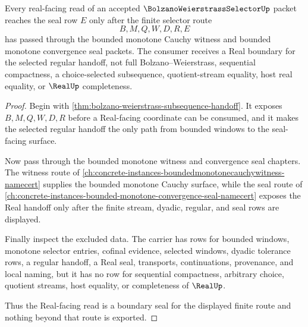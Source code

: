 \begin{theorem}
\label{thm:bolzano-weierstrass-real-seal-boundary}
Every real-facing read of an accepted $\BolzanoWeierstrassSelectorUp$ packet reaches the seal row $E$ only after the finite selector route
$$
B,M,Q,W,D,R,E
$$
has passed through the bounded monotone Cauchy witness and bounded monotone convergence seal packets. The consumer receives a Real boundary for the selected regular handoff, not full Bolzano--Weierstrass, sequential compactness, a choice-selected subsequence, quotient-stream equality, host real equality, or $\RealUp$ completeness.
\end{theorem}
\begin{proof}
Begin with \autoref{thm:bolzano-weierstrass-subsequence-handoff}. It exposes $B,M,Q,W,D,R$ before a Real-facing coordinate can be consumed, and it makes the selected regular handoff the only path from bounded windows to the seal-facing surface.

Now pass through the bounded monotone witness and convergence seal chapters. The witness route of \autoref{ch:concrete-instances-boundedmonotonecauchywitness-namecert} supplies the bounded monotone Cauchy surface, while the seal route of \autoref{ch:concrete-instances-bounded-monotone-convergence-seal-namecert} exposes the Real handoff only after the finite stream, dyadic, regular, and seal rows are displayed.

Finally inspect the excluded data. The carrier has rows for bounded windows, monotone selector entries, cofinal evidence, selected windows, dyadic tolerance rows, a regular handoff, a Real seal, transports, continuations, provenance, and local naming, but it has no row for sequential compactness, arbitrary choice, quotient streams, host equality, or completeness of $\RealUp$.

Thus the Real-facing read is a boundary seal for the displayed finite route and nothing beyond that route is exported.
\end{proof}

